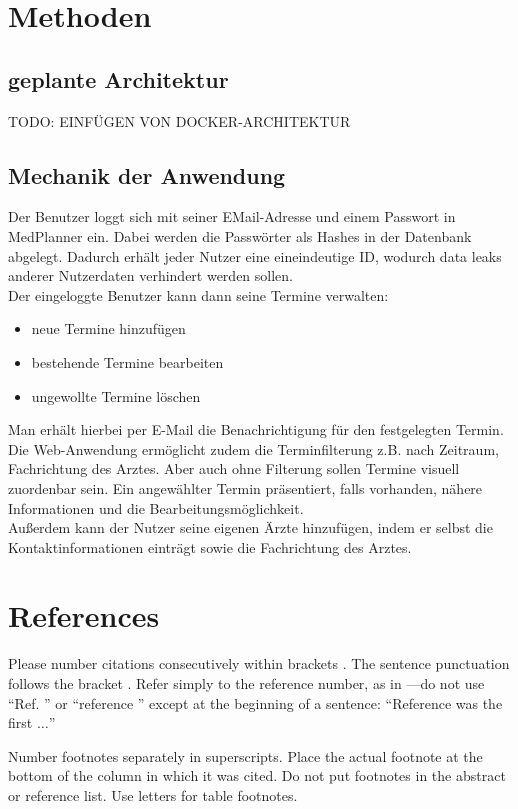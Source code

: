 \documentclass[conference]{IEEEtran}
\begin{document}
\section{Methoden}
\subsection{geplante Architektur}
TODO: EINFÜGEN VON DOCKER-ARCHITEKTUR
\subsection{Mechanik der Anwendung}
Der Benutzer loggt sich mit seiner EMail-Adresse und einem Passwort in MedPlanner ein. Dabei werden die Passwörter als Hashes in der Datenbank abgelegt. Dadurch erhält jeder Nutzer eine eineindeutige ID, wodurch data leaks anderer Nutzerdaten verhindert werden sollen.\\
Der eingeloggte Benutzer kann dann seine Termine verwalten: 
\begin{itemize}
	\item neue Termine hinzufügen
	\item bestehende Termine bearbeiten
	\item ungewollte Termine löschen
\end{itemize}
Man erhält hierbei per E-Mail die Benachrichtigung für den festgelegten Termin.
Die Web-Anwendung ermöglicht zudem die Terminfilterung z.B. nach Zeitraum, Fachrichtung des Arztes. Aber auch ohne Filterung sollen Termine visuell zuordenbar sein. Ein angewählter Termin präsentiert, falls vorhanden, nähere Informationen und die Bearbeitungsmöglichkeit.\\
Außerdem kann der Nutzer seine eigenen Ärzte hinzufügen, indem er selbst die Kontaktinformationen einträgt sowie die Fachrichtung des Arztes.

\section*{References}

Please number citations consecutively within brackets \cite{b1}. The 
sentence punctuation follows the bracket \cite{b2}. Refer simply to the reference 
number, as in \cite{b3}---do not use ``Ref. \cite{b3}'' or ``reference \cite{b3}'' except at 
the beginning of a sentence: ``Reference \cite{b3} was the first $\ldots$''

Number footnotes separately in superscripts. Place the actual footnote at 
the bottom of the column in which it was cited. Do not put footnotes in the 
abstract or reference list. Use letters for table footnotes.
\end{document}
